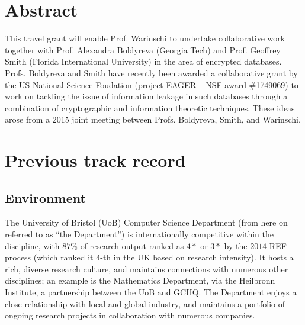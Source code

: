 
\section{Abstract}
\label{sec:abs}

This travel grant will enable Prof. Warinschi to undertake collaborative work together with Prof. Alexandra Boldyreva (Georgia Tech) and Prof. Geoffrey Smith (Florida International University) in the area of encrypted databases.
Profs. Boldyreva and Smith have recently been awarded a collaborative grant by the US National Science Foudation 
(project EAGER -- NSF award \#1749069) to work on tackling the issue of information leakage in such databases through a combination of cryptographic and information theoretic techniques. 
These ideas arose from a 2015 joint meeting between Profs. Boldyreva, Smith, and Warinschi. 


\iffalse
Specifically, the goal is to develop a principled approach to quantifying and understanding the inherent information leakage in such systems.  
The state of the art is, essentially, that 
\fi






\section{Previous track record}
\label{sec:prev}


\iffalse
\subsection{Environment}
\label{sec:prev_env}

The University of Bristol (UoB) Computer Science Department (from here 
on referred to as ``the Department'') is internationally competitive
within the discipline, with $87$\% of research output ranked as $4*$ 
or $3*$ by the $2014$ REF process (which ranked it $4$-th in the UK
based on research intensity).  It hosts a rich, diverse research 
culture, and maintains connections with numerous other disciplines; an
example is the Mathematics Department, via the Heilbronn Institute, a 
partnership between the UoB and GCHQ.  The Department enjoys a close 
relationship with local and global industry, and maintains a portfolio
of ongoing research projects in collaboration with numerous companies.  

